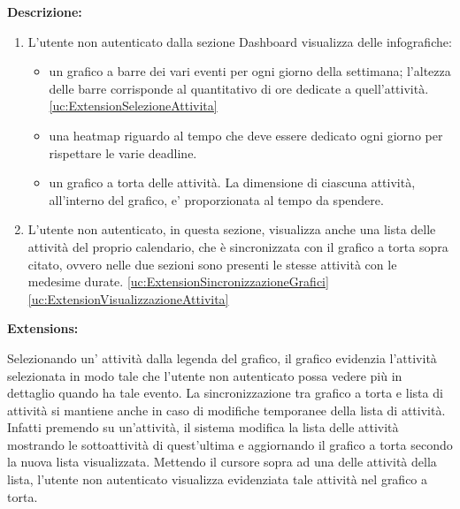 \begin{listaPersonale}[UC]{}
    \textbf{Descrizione:}
    \begin{enumerate}
        \item L'utente non autenticato dalla sezione Dashboard visualizza delle infografiche:
              \begin{itemize}
                  \item un grafico a barre dei vari eventi per ogni giorno della settimana; l'altezza delle barre corrisponde al quantitativo di ore dedicate a quell'attività. \ref{uc:ExtensionSelezioneAttivita}
                  \item una heatmap riguardo al tempo che deve essere dedicato ogni giorno per rispettare le varie deadline.
                  \item un grafico a torta delle attività. La dimensione di ciascuna attività, all'interno del grafico, e' proporzionata al tempo da spendere.
              \end{itemize}
        \item L'utente non autenticato, in questa sezione, visualizza anche una lista delle attività del proprio calendario, che è sincronizzata con il grafico a torta sopra citato, ovvero nelle due sezioni sono presenti le stesse attività con le medesime durate. \ref{uc:ExtensionSincronizzazioneGrafici} \ref{uc:ExtensionVisualizzazioneAttivita}
    \end{enumerate}

    \textbf{Extensions:}
    \begin{enumerate}[label=\textbf{[extension \arabic{enumii}]}, ref= \textbf{[extension \arabic{enumii}]}]
         Selezionando un' attività dalla legenda del grafico, il grafico evidenzia l'attività selezionata in modo tale che l'utente non autenticato possa vedere più in dettaglio quando ha tale evento.
         La sincronizzazione tra grafico a torta e lista di attività si mantiene anche in caso di modifiche temporanee della lista di attività. Infatti premendo su un'attività, il sistema modifica la lista delle attività mostrando le sottoattività di quest'ultima e aggiornando il grafico a torta secondo la nuova lista visualizzata.
         Mettendo il cursore sopra ad una delle attività della lista, l'utente non autenticato visualizza evidenziata tale attività nel grafico a torta.
    \end{enumerate}




\end{listaPersonale}

